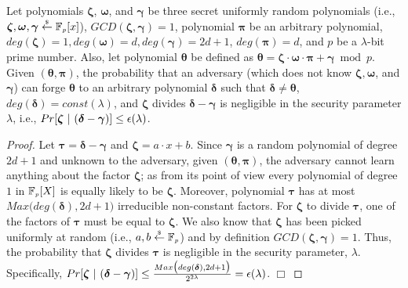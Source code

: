 \begin{theorem}\label{proof::unforgeable-poly}
%
Let polynomials $\bm\zeta$, $\bm\omega$, and $\bm\gamma$ be three secret uniformly random polynomials (i.e., $\bm\zeta,\bm\omega, \bm\gamma\stackrel{\scriptscriptstyle\$}\leftarrow \mathbb F_{\scriptscriptstyle p}[x]$),   $GCD(\bm\zeta, \bm\gamma)=1$, polynomial $\bm\pi$ be an arbitrary polynomial,   $deg(\bm\zeta)= 1, deg(\bm\omega)=d,  deg(\bm\gamma)= 2d+1$,  $deg(\bm\pi)=d$, and $p$ be a $\lambda$-bit prime number. Also, let polynomial $\bm\theta$ be defined as  $\bm\theta=\bm\zeta\cdot \bm\omega\cdot\bm \pi+\bm \gamma \bmod p$. Given $(\bm\theta,\bm\pi)$, the probability that an adversary (which does not know $\bm\zeta, \bm\omega$, and $\bm\gamma$) can forge $\bm\theta$ to an arbitrary polynomial $\bm\delta$ such that  $\bm\delta\neq \bm\theta$, $deg(\bm\delta)= const(\lambda)$, and $\bm\zeta$ divides $\bm\delta-\bm\gamma$ is negligible in the security parameter $\lambda$, i.e., 
%
$Pr[ \bm\zeta \ | \ (\bm\delta-\bm\gamma) ]\leq \negl(\lambda)$.
%
\end{theorem}

\vs
\begin{proof}

Let $\bm\tau=\bm\delta-\bm\gamma$ and $\bm\zeta=a\cdot x+b$. Since $\bm\gamma$ is a random polynomial of degree $2d+1$ and unknown to the adversary, given $(\bm\theta, \bm\pi)$,  the adversary cannot learn anything about the factor $\bm\zeta$; as from its point of view every polynomial of degree $1$ in $\mathbb{F}_{\scriptscriptstyle p}[X]$ is equally likely to be $\bm\zeta$. Moreover,  polynomial $\bm\tau$ has at most $Max\big(deg(\bm\delta), 2d+1\big)$ irreducible non-constant factors.  For $\bm\zeta $ to divide $\bm\tau$,  one of the factors of $\bm\tau$ must be equal to $\bm\zeta$. We  also know that $\bm\zeta$ has been picked uniformly at random (i.e., $a,b
\stackrel{\scriptscriptstyle \$}\leftarrow \mathbb F_{\scriptscriptstyle p}$) and by definition $GCD(\bm\zeta, \bm\gamma)=1$. Thus, the probability that $\bm\zeta $ divides $\bm\tau$ is negligible in the security parameter, $\lambda$. Specifically, $Pr[ \bm\zeta \ | \ (\bm\delta-\bm\gamma)]\leq \frac{Max\big(deg(\bm\delta), 2d+1\big)} {2^{\st 2\lambda}}=\negl(\lambda)$. 
\hfill\(\Box\)\end{proof} 

